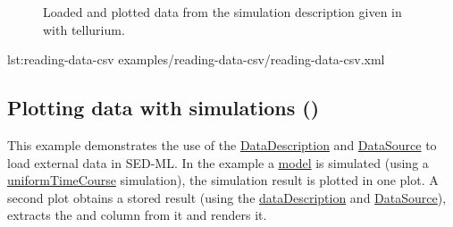 \begin{figure}[ht]
\begin{minipage}{0.47\textwidth}
        \caption{Loaded and plotted data from the simulation description given in  with tellurium.}
    \end{minipage}
    \label{fig:reading-data-csv}
\end{figure}

{lst:reading-data-csv}
{examples/reading-data-csv/reading-data-csv.xml}

\subsection{Plotting data with simulations ()}
This example demonstrates the use of the \hyperref[class:dataDescription]{DataDescription} and \hyperref[class:dataSource]{DataSource} to load external data in SED-ML. In the example a \hyperref[class:model]{model} is simulated (using a \hyperref[class:uniformTimeCourse]{uniformTimeCourse} simulation), the simulation result is plotted in one plot. A second plot obtains a stored result (using the \hyperref[class:dataDescription]{dataDescription} and \hyperref[class:dataSource]{DataSource}), extracts the  and  column from it and renders it.


